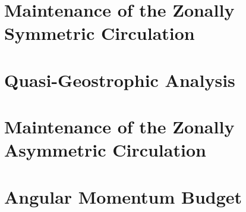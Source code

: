 \part{Maintenance of the Zonally Symmetric Circulation}
\newpage


\part{Quasi-Geostrophic Analysis}
\newpage


\part{Maintenance of the Zonally Asymmetric Circulation}
\newpage


\part{Angular Momentum Budget}
\newpage



